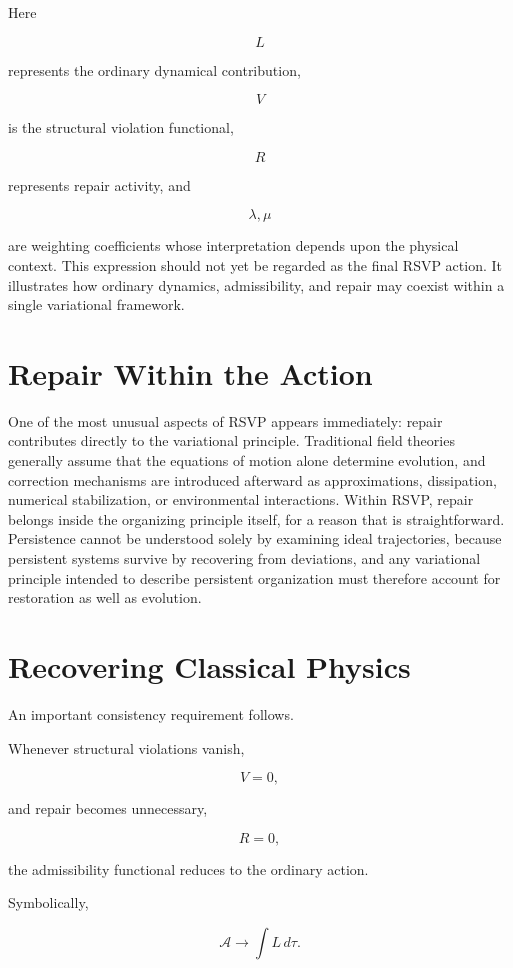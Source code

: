 \documentclass[11pt,oneside]{book}
\numberwithin{equation}{chapter}
\theoremstyle{definition}
\theoremstyle{plain}
\begin{document}
Here

\[
L
\]

represents the ordinary dynamical contribution,

\[
V
\]

is the structural violation functional,

\[
R
\]

represents repair activity, and

\[
\lambda,\mu
\]

are weighting coefficients whose interpretation depends upon the physical context. This expression should not yet be regarded as the final RSVP action. It illustrates how ordinary dynamics, admissibility, and repair may coexist within a single variational framework.

\section{Repair Within the Action}

One of the most unusual aspects of RSVP appears immediately: repair contributes directly to the variational principle. Traditional field theories generally assume that the equations of motion alone determine evolution, and correction mechanisms are introduced afterward as approximations, dissipation, numerical stabilization, or environmental interactions. Within RSVP, repair belongs inside the organizing principle itself, for a reason that is straightforward. Persistence cannot be understood solely by examining ideal trajectories, because persistent systems survive by recovering from deviations, and any variational principle intended to describe persistent organization must therefore account for restoration as well as evolution.

\section{Recovering Classical Physics}

An important consistency requirement follows.

Whenever structural violations vanish,

\[
V=0,
\]

and repair becomes unnecessary,

\[
R=0,
\]

the admissibility functional reduces to the ordinary action.

Symbolically,

\[
\mathcal A
\longrightarrow
\int
L\,d\tau.
\]
\end{document}
